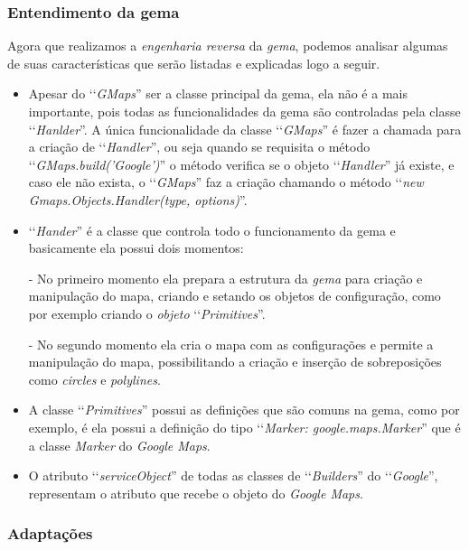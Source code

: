  
\subsubsection{Entendimento da gema} 
\label{entendimento_da_gema} 

Agora que realizamos a \emph{engenharia reversa} da \emph{gema}, podemos analisar algumas de suas 
características que serão listadas e explicadas logo a seguir.

\begin{itemize}

 \item Apesar do ‘‘\emph{GMaps}'' ser a classe principal da gema, ela não é a mais
 importante, pois todas as funcionalidades da gema são controladas pela classe
 ‘‘\emph{Hanlder}''. A única funcionalidade da classe ‘‘\emph{GMaps}'' é fazer a chamada
 para a criação de ‘‘\emph{Handler}'', ou seja quando se requisita o método 
 ‘‘\emph{GMaps.build('Google')}'' o método verifica se o objeto ‘‘\emph{Handler}'' já
 existe, e caso ele não exista, o ‘‘\emph{GMaps}'' faz a criação chamando o método 
 ‘‘\emph{new Gmaps.Objects.Handler(type, options)}''.

 \item ‘‘\emph{Hander}'' é a classe que controla todo o funcionamento da gema e 
 basicamente ela possui dois momentos:
 
  \subitem - No primeiro momento ela prepara a estrutura da \emph{gema} para criação e manipulação
  do mapa, criando e setando os objetos de configuração, como por exemplo criando o \emph{objeto}
  ‘‘\emph{Primitives}''.
  
  \subitem - No segundo momento ela cria o mapa com as configurações e permite a manipulação do mapa, 
  possibilitando a criação e inserção de sobreposições como \emph{circles} e \emph{polylines}.
 
 \item A classe ‘‘\emph{Primitives}'' possui as definições que são comuns na gema, 
 como por exemplo, é ela possui a definição do tipo ‘‘\emph{Marker: google.maps.Marker}'' que 
 é a classe \emph{Marker} do \emph{Google Maps}.
 
 \item O atributo ‘‘\emph{serviceObject}'' de todas as classes de 
 ‘‘\emph{Builders}'' do ‘‘\emph{Google}'', representam o atributo que recebe o objeto do 
 \emph{Google Maps}.
 
\end{itemize}
 
\subsubsection{Adaptações}
\label{adaptações}

